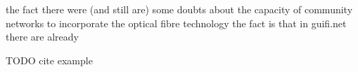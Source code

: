  the fact there were (and still are) some doubts about the capacity of community networks to incorporate the optical fibre technology the fact is that in guifi.net there are already 

TODO cite example~\cite{barcelo2012bub}